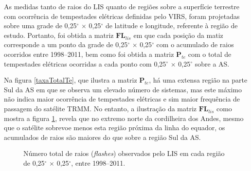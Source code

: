 As medidas tanto de raios do LIS quanto de regiões sobre a superfície terrestre com ocorrência de tempestades elétricas definidas pelo VIRS, foram projetadas sobre uma grade de  0,25$^{\circ}$ $\times$ 0,25$^{\circ}$ de latitude e longitude, referente à região de estudo. Portanto, foi obtida a matriz $\mathbf{FL}_{lis}$ em que cada posição da matiz corresponde a um ponto da grade de 0,25$^{\circ}$ $\times$ 0,25$^{\circ}$ com o acumulado de raios ocorridos entre 1998--2011, bem como foi obtida a matriz $\mathbf{P}_{te}$ com o total de tempestades elétricas ocorridas a cada ponto com 0,25$^{\circ}$ $\times$ 0,25$^{\circ}$ sobre a AS.




Na figura \ref{taxaTotalTe}, que ilustra a matriz $\mathbf{P}_{te}$, há uma extensa região na parte Sul da AS em que se observa um elevado número de sistemas, mas este máximo não indica maior ocorrência de tempestades elétricas e sim maior frequência de passagem do satélite TRMM. No entanto, a ilustração da matriz $\mathbf{FL}_{lis}$ como mostra a figura \ref{taxatotalraios}, revela que no extremo norte da cordilheira dos Andes, mesmo que o satélite sobrevoe menos esta região próxima da linha do equador, os acumulados de raios são maiores do que sobre a região Sul da AS. 



\begin{figure}[!ht]
  \centering
\caption{Número total de raios (\textit{flashes}) observados pelo LIS em cada região de 0,25$^{\circ}$  $\times$ 0,25$^{\circ}$,  entre 1998--2011.}
\label{taxatotalraios}
\end{figure}   
  
